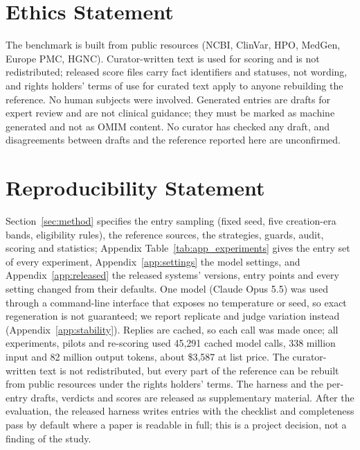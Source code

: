 \documentclass{article} %
\begin{document}
\section*{Ethics Statement}
The benchmark is built from public resources (NCBI, ClinVar, HPO, MedGen, Europe PMC, HGNC). Curator-written text is used for scoring and is not redistributed; released score files carry fact identifiers and statuses, not wording, and rights holders' terms of use for curated text apply to anyone rebuilding the reference. No human subjects were involved. Generated entries are drafts for expert review and are not clinical guidance; they must be marked as machine generated and not as OMIM content. No curator has checked any draft, and disagreements between drafts and the reference reported here are unconfirmed.

\section*{Reproducibility Statement}
Section~\ref{sec:method} specifies the entry sampling (fixed seed, five creation-era bands, eligibility rules), the reference sources, the strategies, guards, audit, scoring and statistics; Appendix Table~\ref{tab:app_experiments} gives the entry set of every experiment, Appendix~\ref{app:settings} the model settings, and Appendix~\ref{app:released} the released systems' versions, entry points and every setting changed from their defaults. One model (Claude Opus 5.5) was used through a command-line interface that exposes no temperature or seed, so exact regeneration is not guaranteed; we report replicate and judge variation instead (Appendix~\ref{app:stability}). Replies are cached, so each call was made once; all experiments, pilots and re-scoring used 45,291 cached model calls, 338 million input and 82 million output tokens, about \$3,587 at list price. The curator-written text is not redistributed, but every part of the reference can be rebuilt from public resources under the rights holders' terms. The harness and the per-entry drafts, verdicts and scores are released as supplementary material. After the evaluation, the released harness writes entries with the checklist and completeness pass by default where a paper is readable in full; this is a project decision, not a finding of the study.




\clearpage
\appendix
\setlength{\belowcaptionskip}{4pt}
\makeatletter
\setlength{\@fptop}{0pt}
\setlength{\@fpbot}{0pt plus 1fil}
\setlength{\@fpsep}{8pt plus 2pt minus 2pt}
\setlength{\abovecaptionskip}{4pt}
\setlength{\intextsep}{8pt plus 2pt minus 2pt}
\setlength{\floatsep}{8pt plus 2pt minus 2pt}
\setlength{\textfloatsep}{12pt plus 2pt minus 2pt}
\makeatother
\FloatBarrier
\end{document}
